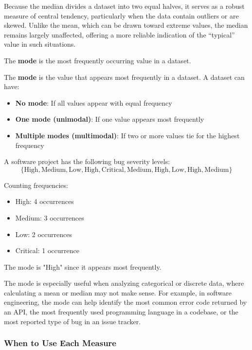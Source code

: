 Because the median divides a dataset into two equal halves, it serves as a robust measure of central tendency, particularly when the data contain outliers or are skewed. Unlike the mean, which can be drawn toward extreme values, the median remains largely unaffected, offering a more reliable indication of the ``typical'' value in such situations.

The \textbf{mode} is the most frequently occurring value in a dataset.

\begin{definition}[Mode]
The \textbf{mode} is the value that appears most frequently in a dataset. A dataset can have:
\begin{itemize}
    \item \textbf{No mode}: If all values appear with equal frequency
    \item \textbf{One mode (unimodal)}: If one value appears most frequently
    \item \textbf{Multiple modes (multimodal)}: If two or more values tie for the highest frequency
\end{itemize}
\end{definition}

\begin{example}
A software project has the following bug severity levels:
\[
\{\text{High}, \text{Medium}, \text{Low}, \text{High}, \text{Critical}, \text{Medium}, \text{High}, \text{Low}, \text{High}, \text{Medium}\}
\]

Counting frequencies:
\begin{itemize}
    \item High: 4 occurrences
    \item Medium: 3 occurrences  
    \item Low: 2 occurrences
    \item Critical: 1 occurrence
\end{itemize}

The mode is "High" since it appears most frequently.
\end{example}

The mode is especially useful when analyzing categorical or discrete data, where calculating a mean or median may not make sense. For example, in software engineering, the mode can help identify the most common error code returned by an API, the most frequently used programming language in a codebase, or the most reported type of bug in an issue tracker.

\subsubsection*{When to Use Each Measure}

